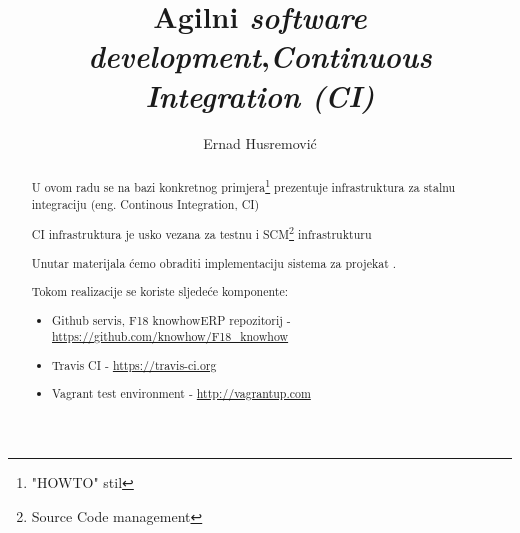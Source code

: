 \documentclass[times, utf8, seminar]{fit}
\begin{document}


\title{Agilni \emph{software development},\newline \emph{Continuous Integration (CI)}}

\author{Ernad Husremović}


\maketitle

\tableofcontents

\newpage

\begin{abstract}

U ovom radu se na bazi konkretnog primjera\footnote{"HOWTO" stil} prezentuje infrastruktura za stalnu integraciju (eng. Continous Integration, CI) 

CI infrastruktura je usko vezana za testnu i SCM\footnote{Source Code management} infrastrukturu\citep{agilegit}

Unutar materijala ćemo obraditi implementaciju \href{http://travis-ci.org}{\color{blue}{''Travis Continous Integration''}} sistema za projekat \href{http://redmine.bring.out.ba/projects/knowhow}{\color{blue}{''F18 knowhow''}}.

Tokom realizacije se koriste sljedeće komponente:
\begin{itemize}
  \item Github servis, F18 knowhowERP repozitorij - \url{https://github.com/knowhow/F18\_knowhow}
  \item Travis CI - \url{https://travis-ci.org}
  \item Vagrant test environment - \url{http://vagrantup.com}
\end{itemize}

\end{abstract}

\end{document}
